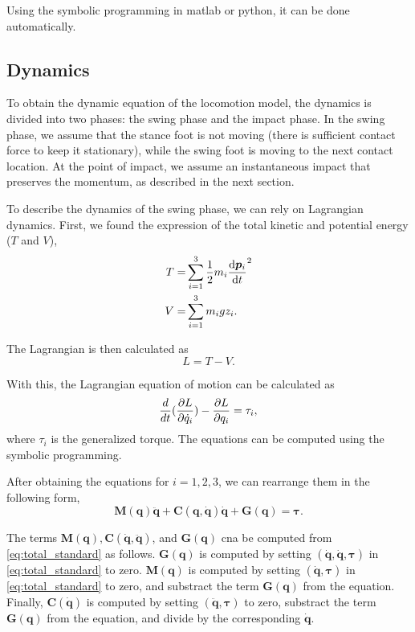 Using the symbolic programming in matlab or python, it can be done automatically. 

\subsection{Dynamics}
\label{sec:dyn}
To obtain the dynamic equation of the locomotion model, the dynamics is divided into two phases: the swing phase and the impact phase. In the swing phase, we assume that the stance foot is not moving (there is sufficient contact force to keep it stationary), while the swing foot is moving to the next contact location. At the point of impact, we assume an instantaneous impact that preserves the momentum, as described in the next section. 

To describe the dynamics of the swing phase, we can rely on Lagrangian dynamics. First, we found the expression of the total kinetic and potential energy ($T$ and $V$),
\begin{align}
T = & \sum_{i=1}^{3} \frac{1}{2} m_i \dv{\bm{p}_i}{t}^2 \\
V = & \sum_{i=1}^{3} m_i g z_i.
\end{align}

The Lagrangian is then calculated as 
\begin{equation}
L = T - V . 
\end{equation}

With this, the Lagrangian equation of motion can be calculated as
\begin{equation}
\frac{d}{dt} (\pdv{L}{\dot{q}_i}) - \pdv{L}{q_i} = \tau_i,
\label{eq:total_lagrange}
\end{equation}
where $\tau_i$ is the generalized torque. The equations can be computed using the symbolic programming. 

After obtaining the equations for $i = 1, 2, 3$, we can rearrange them in the following form, 
\begin{equation}
\bm{M}(\bm{q})\ddot{\bm{q}} + \bm{C}({\bm{q}},\dot{\bm{q}})\dot{\bm{q}} + \bm{G}({\bm{q}}) = \bm{\tau}. 
\label{eq:total_standard}
\end{equation}

The terms $\bm{M}(\bm{q}), \bm{C}(\dot{\bm{q}},\ddot{\bm{q}})$, and $\bm{G}({\bm{q}})$ cna be computed from \eqref{eq:total_standard} as follows. $\bm{G}(\bm{q})$ is computed by setting $(\dot{\bm{q}}, \dot{\bm{q}}, \bm{\tau})$ in \eqref{eq:total_standard} to zero. 
$\bm{M}(\bm{q})$ is computed by setting $(\dot{\bm{q}},\bm{\tau})$ in \eqref{eq:total_standard} to zero, and substract the term $\bm{G}(\bm{q})$ from the equation. Finally, $\bm{C}(\dot{\bm{q}})$ is computed by setting 
$(\ddot{\bm{q}}, \bm{\tau})$ to zero, substract the term $\bm{G}(\bm{q})$ from the equation, and divide by the corresponding $\dot{\bm{q}}$. 

